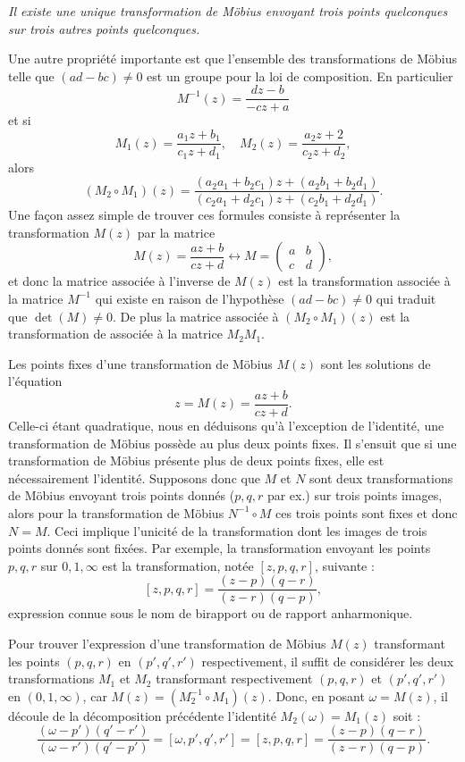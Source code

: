 \emph{Il existe une unique transformation de Möbius envoyant trois points quelconques sur trois autres points quelconques.}

Une autre propriété importante est que l'ensemble des transformations de Möbius telle que $(ad-bc) \neq 0$ est un groupe pour la loi de composition. En particulier 
\[M^{-1}(z)=\frac{dz-b}{-cz +a}\]
et si 
\[M_1(z)=\frac{a_1 z +b_1}{c_1 z +d_1}, \quad M_2(z)=\frac{a_2 z +2}{c_2 z +d_2},\]
alors
\[(M_2 \circ M_1)(z)=\frac{(a_2 a_1 + b_2 c_1) z + (a_2 b_1 + b_2 d_1)}{(c_2a_1 + d_2 c_1)z +(c_2 b_1 + d_2 d_1)}.\]
Une façon assez simple de trouver ces formules consiste à représenter la transformation $M(z)$ par la matrice
\[M(z)=\frac{a z +b}{cz +d} \longleftrightarrow M=\begin{pmatrix}
a &b\\c&d
\end{pmatrix},\]
et donc la matrice associée à l'inverse de $M(z)$ est la transformation associée à la matrice $M^{-1}$ qui existe en raison de l'hypothèse $(ad -bc) \neq 0$ qui traduit que $\det(M) \neq 0$. De plus la matrice associée à $(M_2 \circ M_1)(z)$ est la transformation de associée à la matrice $M_2 M_1$. 


Les points fixes d'une transformation de Möbius $M(z)$ sont les solutions de l'équation 
\[z=M(z)=\frac{a z +b}{c z +d}.\]
Celle-ci étant quadratique, nous en déduisons qu'à l'exception de l'identité, une transformation de Möbius possède au plus deux points fixes. Il s'ensuit que si une transformation de Möbius présente plus de deux points fixes, elle est nécessairement l'identité. Supposons donc que $M$ et $N$ sont deux transformations de Möbius envoyant trois points donnés ($p,q,r$ par ex.) sur trois points images, alors pour la transformation de Möbius $N^{-1} \circ M$ ces trois points sont fixes et donc $N=M$. Ceci implique l'unicité de la transformation dont les images de trois points donnés sont fixées. Par exemple, la transformation envoyant les points $p,q,r$ sur $0,1,\infty$ est la transformation, notée $[z,p,q,r]$, suivante :
\[[z,p,q,r] =\frac{(z-p)(q-r)}{(z-r)(q-p)},\]
expression connue sous le nom de birapport ou de rapport anharmonique.

Pour trouver l'expression d'une transformation de Möbius $M(z)$ transformant les points $(p,q,r)$ en $(p',q',r')$ respectivement, il suffit de considérer les deux transformations $M_1$ et $M_2$ transformant respectivement $(p,q,r)$ et $(p',q',r')$ en $(0,1,\infty)$, car $M(z)=(M_2^{-1} \circ M_1)(z)$. Donc, en posant $\omega =M(z)$, il découle de la décomposition précédente l'identité $M_2(\omega)=M_1(z)$ soit :
\begin{equation}\label{eq:Mob1}\frac{(\omega-p')(q'-r')}{(\omega-r')(q'-p')} = [\omega,p',q',r']=[z,p,q,r]=\frac{(z-p)(q-r)}{(z-r)(q-p)}.
\end{equation}

